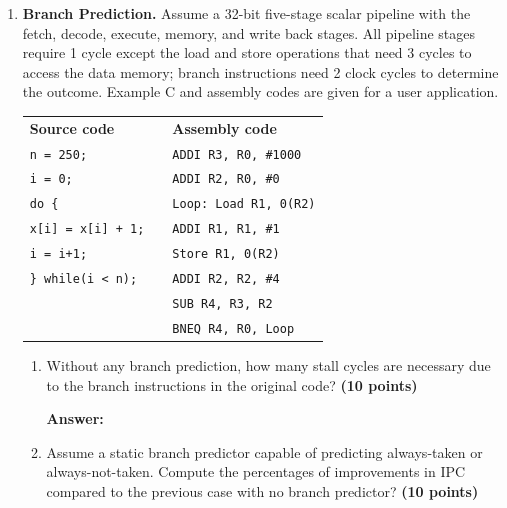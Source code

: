 \documentclass[a4paper, 11pt]{exam}
\begin{document}
\begin{center}
\begin{enumerate}
\item \textbf{Branch Prediction.}
Assume a 32-bit five-stage scalar pipeline with the fetch, decode, execute, memory, and write back stages.
All pipeline stages require 1 cycle except the load and store operations that need 3 cycles to access the data memory; branch instructions need 2 clock cycles to determine the outcome.
Example C and assembly codes are given for a user application.

\begin{tabular}{lll}
	\textbf{Source code} & & \textbf{Assembly code }\\
	\texttt{n = 250;}&  &\hspace{40pt}\texttt{ADDI R3, R0, \#1000} \\
	\texttt{i = 0;} &  &\hspace{40pt}\texttt{ADDI R2, R0, \#0}\\
	\texttt{do \{} &  &\texttt{Loop: Load  R1, 0(R2)} \\
	\hspace{20pt}\texttt{x[i] = x[i] + 1;}&  &\hspace{40pt}\texttt{ADDI   R1, R1, \#1}\\
	\hspace{20pt}\texttt{i = i+1;}&  &\hspace{40pt}\texttt{Store  R1, 0(R2)}\\
	\texttt{\} while(i < n);}&  &\hspace{40pt}\texttt{ADDI R2, R2, \#4}\\
	&  &\hspace{40pt}\texttt{SUB R4, R3, R2}\\
	&  &\hspace{40pt}\texttt{BNEQ R4, R0, Loop}\\
\end{tabular}

\begin{enumerate}
	\item  Without any branch prediction, how many stall cycles are necessary due to the branch instructions in the original code? \textbf {(10 points)}
	
\hfill
 
\textbf{Answer:} 

\hfill

    \item  Assume a static branch predictor capable of predicting always-taken or always-not-taken. Compute the percentages of improvements in IPC compared to the previous case with no branch predictor? \textbf {(10 points)}
    

\end{enumerate}
\end{enumerate}
\end{center}
\end{document}
